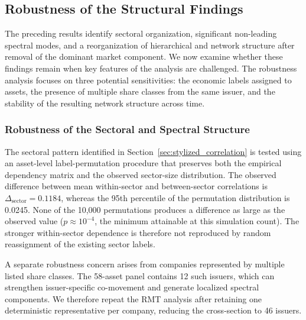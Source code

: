 \subsection{Robustness of the Structural Findings}
\label{sec:robustness}

The preceding results identify sectoral organization, significant non-leading spectral modes, and a reorganization of hierarchical and network structure after removal of the dominant market component. We now examine whether these findings remain when key features of the analysis are challenged. The robustness analysis focuses on three potential sensitivities: the economic labels assigned to assets, the presence of multiple share classes from the same issuer, and the stability of the resulting network structure across time.

\subsubsection{Robustness of the Sectoral and Spectral Structure}

The sectoral pattern identified in Section~\ref{sec:stylized_correlation} is tested using an asset-level label-permutation procedure that preserves both the empirical dependency matrix and the observed sector-size distribution. The observed difference between mean within-sector and between-sector correlations is $\Delta_{\mathrm{sector}}=0.1184$, whereas the 95th percentile of the permutation distribution is 0.0245. None of the 10,000 permutations produces a difference as large as the observed value ($p\approx 10^{-4}$, the minimum attainable at this simulation count). The stronger within-sector dependence is therefore not reproduced by random reassignment of the existing sector labels.

A separate robustness concern arises from companies represented by multiple listed share classes. The 58-asset panel contains 12 such issuers, which can strengthen issuer-specific co-movement and generate localized spectral components. We therefore repeat the RMT analysis after retaining one deterministic representative per company, reducing the cross-section to 46 issuers.

\begin{center}
\label{tab:issuer_rmt_robustness}
\small
{}
\end{center}



